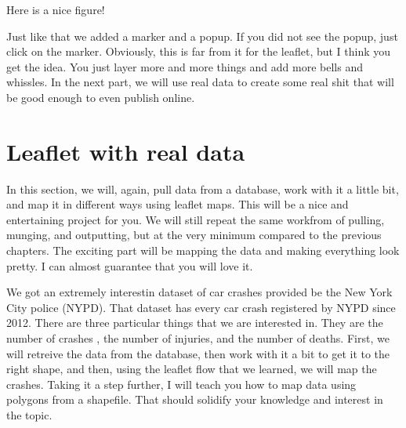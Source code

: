 \documentclass[]{book}
\newenvironment{Shaded}{\begin{snugshade}}{\end{snugshade}}
\newcommand{\CommentTok}[1]{\textcolor[rgb]{0.56,0.35,0.01}{\textit{#1}}}
\newcommand{\DataTypeTok}[1]{\textcolor[rgb]{0.13,0.29,0.53}{#1}}
\newcommand{\DecValTok}[1]{\textcolor[rgb]{0.00,0.00,0.81}{#1}}
\newcommand{\FloatTok}[1]{\textcolor[rgb]{0.00,0.00,0.81}{#1}}
\newcommand{\KeywordTok}[1]{\textcolor[rgb]{0.13,0.29,0.53}{\textbf{#1}}}
\newcommand{\NormalTok}[1]{#1}
\newcommand{\OperatorTok}[1]{\textcolor[rgb]{0.81,0.36,0.00}{\textbf{#1}}}
\newcommand{\StringTok}[1]{\textcolor[rgb]{0.31,0.60,0.02}{#1}}
\begin{document}
\begin{Shaded}
\end{Shaded}

\hypertarget{htmlwidget-59c2fe7a18d2d583bdfb}{}

\label{fig:nice-fig77}Here is a nice figure!

Just like that we added a marker and a popup. If you did not see the popup, just click on the marker. Obviously, this is far from it for the leaflet, but I think you get the idea. You just layer more and more things and add more bells and whissles. In the next part, we will use real data to create some real shit that will be good enough to even publish online.

\hypertarget{leaflet-with-real-data}{%
\section{Leaflet with real data}\label{leaflet-with-real-data}}

In this section, we will, again, pull data from a database, work with it a little bit, and map it in different ways using leaflet maps. This will be a nice and entertaining project for you. We will still repeat the same workfrom of pulling, munging, and outputting, but at the very minimum compared to the previous chapters. The exciting part will be mapping the data and making everything look pretty. I can almost guarantee that you will love it.

We got an extremely interestin dataset of car crashes provided be the New York City police (NYPD). That dataset has every car crash registered by NYPD since 2012. There are three particular things that we are interested in. They are the number of crashes , the number of injuries, and the number of deaths. First, we will retreive the data from the database, then work with it a bit to get it to the right shape, and then, using the leaflet flow that we learned, we will map the crashes. Taking it a step further, I will teach you how to map data using polygons from a shapefile. That should solidify your knowledge and interest in the topic.
\end{document}
